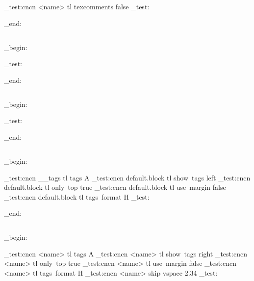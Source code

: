 \ExplSyntaxOn
\CDR_test:cncn { <name> } { tl } { texcomments } { false }
\CDR_test:

\group_end:
\ExplSyntaxOff

\subsection{}
\ExplSyntaxOn
\group_begin:

\CDRSet{
}

\CDR_test:

\group_end:
\ExplSyntaxOff

\subsection{}
\ExplSyntaxOn
\group_begin:

\CDRSet{
}

\CDR_test:

\group_end:
\ExplSyntaxOff

\subsection{}
\ExplSyntaxOn
\group_begin:


\CDR_test:cncn { __tags } { tl } { tags } { A }
\CDR_test:cncn { default.block } { tl } { show~tags } { left }
\CDR_test:cncn { default.block } { tl } { only~top } { true }
\CDR_test:cncn { default.block } { tl } { use~margin } { false }
\CDR_test:cncn { default.block } { tl } { tags~format } { H }
\CDR_test:

\group_end:
\ExplSyntaxOff

\subsection{}

\ExplSyntaxOn
\group_begin:

\def\CDR@Debug#1{
\typeout{****~Debug~#1}
}


\CDR_test:cncn { <name> } { tl } { tags } { A }
\CDR_test:cncn { <name> } { tl } { show~tags } { right }
\CDR_test:cncn { <name> } { tl } { only~top } { true }
\CDR_test:cncn { <name> } { tl } { use~margin } { false }
\CDR_test:cncn { <name> } { tl } { tags~format } { H }
\CDR_test:cncn { <name> } { skip } { vspace } { 2.34\baselineskip }
\CDR_test:

